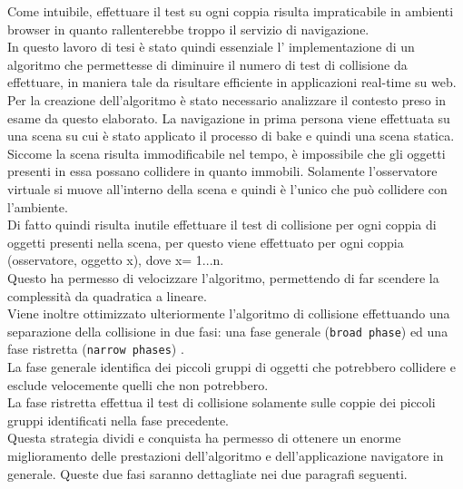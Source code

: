 Come intuibile, effettuare il test su ogni coppia risulta impraticabile in ambienti browser in quanto rallenterebbe troppo il servizio di navigazione. 
\\
In questo lavoro di tesi è stato quindi essenziale l’ implementazione di un algoritmo che permettesse di diminuire il numero di test di collisione da effettuare, in maniera tale da risultare efficiente in applicazioni real-time su web.
\\
Per la creazione dell’algoritmo è stato necessario analizzare il contesto preso in esame da questo elaborato.
La navigazione in prima persona viene effettuata su una scena su cui è stato applicato il processo di bake e quindi una scena statica. Siccome la scena risulta immodificabile nel tempo, è impossibile che gli oggetti presenti in essa possano collidere in quanto immobili.
Solamente l’osservatore virtuale si muove all’interno della scena e quindi è l’unico che può collidere con l’ambiente.
\\
Di fatto quindi risulta inutile effettuare il test di collisione per ogni coppia di oggetti presenti nella scena, per questo viene effettuato per ogni coppia (osservatore, oggetto x), dove x= 1...n.
\\
Questo ha permesso di velocizzare l’algoritmo, permettendo di far scendere la complessità da quadratica a lineare.
\\
Viene inoltre ottimizzato ulteriormente l’algoritmo di collisione effettuando una separazione della collisione in due fasi: una fase generale (\texttt{broad phase}) ed una fase ristretta (\texttt{narrow phases}) \cite{real_time_collision}.
\\
La fase generale identifica dei piccoli gruppi di oggetti che potrebbero collidere e esclude velocemente quelli che non potrebbero.
\\
La fase ristretta effettua il test di collisione solamente sulle coppie dei piccoli gruppi identificati nella fase precedente.
\\
Questa strategia dividi e conquista ha permesso di ottenere un enorme miglioramento delle prestazioni dell’algoritmo e dell’applicazione navigatore in generale. Queste due fasi saranno dettagliate nei due paragrafi seguenti.

